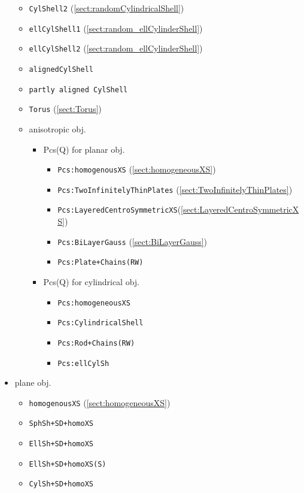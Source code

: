 \begin{itemize}
\begin{itemize}
\item \texttt{CylShell2} (\ref{sect:randomCylindricalShell})
\item \texttt{ellCylShell1} (\ref{sect:random_ellCylinderShell})
\item \texttt{ellCylShell2} (\ref{sect:random_ellCylinderShell})
\item \texttt{alignedCylShell}
\item \texttt{partly aligned CylShell}
\item \texttt{Torus} (\ref{sect:Torus})
\end{itemize}
\begin{itemize}
  \item anisotropic obj.
  \begin{itemize}
    \item Pcs(Q) for planar obj.
    \begin{itemize}
      \item \texttt{Pcs:homogenousXS} (\ref{sect:homogeneousXS})
      \item \texttt{Pcs:TwoInfinitelyThinPlates} (\ref{sect:TwoInfinitelyThinPlates})
      \item \texttt{Pcs:LayeredCentroSymmetricXS}(\ref{sect:LayeredCentroSymmetricXS})
      \item \texttt{Pcs:BiLayerGauss} (\ref{sect:BiLayerGauss})
      \item \texttt{Pcs:Plate+Chains(RW)}
    \end{itemize}
    \item Pcs(Q) for cylindrical obj.
    \begin{itemize}
      \item \texttt{Pcs:homogeneousXS}
      \item \texttt{Pcs:CylindricalShell}
      \item \texttt{Pcs:Rod+Chains(RW)}
      \item \texttt{Pcs:ellCylSh}
    \end{itemize}
  \end{itemize}
\end{itemize}
\item plane obj.
\begin{itemize}
  \item \texttt{homogenousXS} (\ref{sect:homogeneousXS})
  \item \texttt{SphSh+SD+homoXS}
  \item \texttt{EllSh+SD+homoXS}
  \item \texttt{EllSh+SD+homoXS(S)}
  \item \texttt{CylSh+SD+homoXS}

\end{itemize}
\end{itemize}

